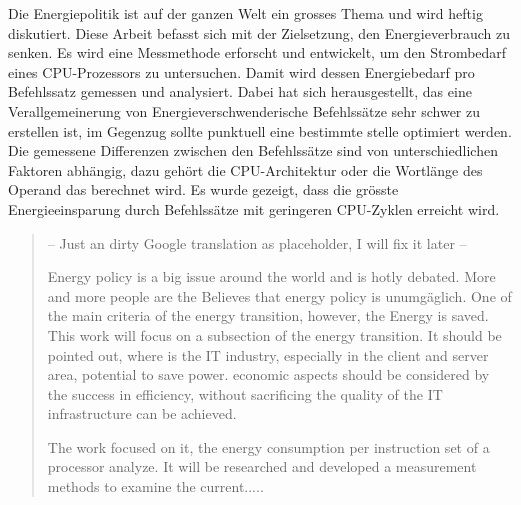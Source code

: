 \begin{zusammenfassung}

Die Energiepolitik ist auf der ganzen Welt ein grosses Thema und wird heftig diskutiert. Diese Arbeit befasst sich mit der Zielsetzung, den Energieverbrauch zu senken. Es wird eine Messmethode erforscht und entwickelt, um den Strombedarf eines CPU-Prozessors zu untersuchen. Damit wird dessen Energiebedarf pro Befehlssatz gemessen und analysiert. Dabei hat sich herausgestellt, das eine Verallgemeinerung von Energieverschwenderische Befehlssätze sehr schwer zu erstellen ist, im Gegenzug sollte punktuell eine bestimmte stelle optimiert werden. Die gemessene Differenzen zwischen den Befehlssätze sind von unterschiedlichen Faktoren abhängig, dazu gehört die CPU-Architektur oder die Wortlänge des Operand das berechnet wird. Es wurde gezeigt, dass die grösste Energieeinsparung durch Befehlssätze mit geringeren CPU-Zyklen erreicht wird. 





\end{zusammenfassung}

\begin{abstract} 

-- Just an dirty Google translation as placeholder, I will fix it later --
\par
Energy policy is a big issue around the world and is hotly debated. More and more people are the
Believes that energy policy is unumgäglich. One of the main criteria of the energy transition, however, the
Energy is saved. This work will focus on a subsection of the energy transition. It should be pointed out,
where is the IT industry, especially in the client and server area, potential to save power. economic aspects
should be considered by the success in efficiency, without sacrificing the quality of the IT infrastructure
can be achieved.
\par
The work focused on it, the energy consumption per instruction set of a processor
analyze. It will be researched and developed a measurement methods to examine the current.....

\end{abstract}
